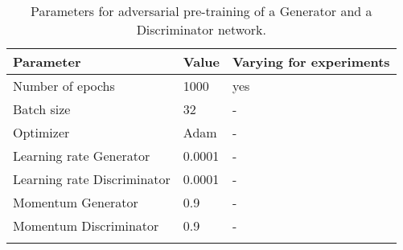 \begin{table}[ht!]
\begin{center}
\caption{Parameters for adversarial pre-training of a Generator and a Discriminator network.}
\begin{tabular}{ M{6cm}  M{2cm} M{2cm}}
\toprule
\textbf{Parameter} & \textbf{Value} & \textbf{Varying for experiments} \\
\midrule
Number of epochs & 1000 & yes\\
Batch size & 32 & -\\
\midrule
Optimizer & Adam & -\\
Learning rate Generator & 0.0001 & -\\
Learning rate Discriminator & 0.0001 & -\\
Momentum Generator & 0.9 & -\\
Momentum Discriminator & 0.9 & -\\
\bottomrule
\label{tab:exp_details_params_pre_train}
\end{tabular}
\end{center}
\vspace{-4mm}
\end{table}
\FloatBarrier
\noindent